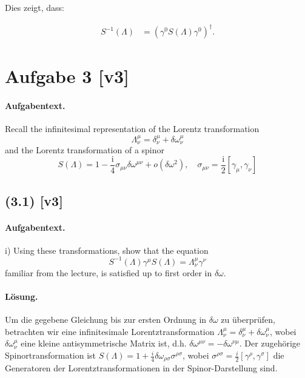 \documentclass[11pt,a4paper]{article}
\begin{document}
Dies zeigt, dass:

\begin{align*}
S^{-1}(\Lambda) &= \left(\gamma^0 S(\Lambda) \gamma^0\right)^{\dagger}.
\end{align*}


\section*{Aufgabe 3 [v3]}
\paragraph{Aufgabentext.}
Recall the infinitesimal representation of the Lorentz transformation
$$
\Lambda_\nu^\mu=\delta_\nu^\mu+\delta \omega_\nu^\mu
$$
and the Lorentz transformation of a spinor
$$
S(\Lambda)=1-\frac{\mathrm{i}}{4} \sigma_{\mu \nu} \delta \omega^{\mu \nu}+o\left(\delta \omega^2\right), \quad \sigma_{\mu \nu}=\frac{\mathrm{i}}{2}\left[\gamma_\mu, \gamma_\nu\right]
$$

\subsection*{(3.1) [v3]}
\paragraph{Aufgabentext.}
i) Using these transformations, show that the equation
$$
S^{-1}(\Lambda) \gamma^\mu S(\Lambda)=\Lambda_\nu^\mu \gamma^\nu
$$
familiar from the lecture, is satisfied up to first order in $\delta \omega$.

\paragraph{Lösung.}
Um die gegebene Gleichung bis zur ersten Ordnung in $\delta \omega$ zu überprüfen, betrachten wir eine infinitesimale Lorentztransformation $\Lambda^\mu_\nu = \delta^\mu_\nu + \delta \omega^\mu_\nu$, wobei $\delta \omega^\mu_\nu$ eine kleine antisymmetrische Matrix ist, d.h. $\delta \omega^{\mu\nu} = -\delta \omega^{\nu\mu}$. Der zugehörige Spinortransformation ist $S(\Lambda) = 1 + \frac{i}{4} \delta \omega_{\rho\sigma} \sigma^{\rho\sigma}$, wobei $\sigma^{\rho\sigma} = \frac{i}{2} [\gamma^\rho, \gamma^\sigma]$ die Generatoren der Lorentztransformationen in der Spinor-Darstellung sind.
\end{document}
